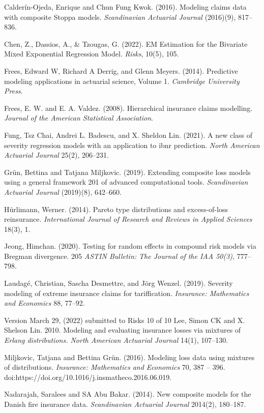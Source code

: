 \documentclass[12pt]{article}%
\theoremstyle{definition}
\theoremstyle{remark}
\begin{document}
{\begin{thebibliography}{}
	\bibitem{} Calderín-Ojeda, Enrique and Chun Fung Kwok. (2016). Modeling claims data with composite Stoppa models. \textit{Scandinavian Actuarial Journal }(2016)(9), 817–836.
	
	\bibitem{} Chen, Z., Dassios, A., \& Tzougas, G. (2022). EM Estimation for the Bivariate Mixed Exponential Regression Model. \textit{Risks}, 10(5), 105.
	
	\bibitem{}Frees, Edward W, Richard A Derrig, and Glenn Meyers. (2014). Predictive modeling applications in actuarial science, Volume 1. \textit{Cambridge University Press}.
	
	\bibitem{}Frees, E. W. and E. A. Valdez. (2008). Hierarchical insurance claims modelling. \textit{Journal of the American 
		Statistical Association}. 
	
	\bibitem{}Fung, Tsz Chai, Andrei L. Badescu, and X. Sheldon Lin. (2021). A new class of severity regression models 
	with an application to ibnr prediction. \textit{North American Actuarial Journal} 25(2), 206–231. 
	
	\bibitem{}Grün, Bettina and Tatjana Miljkovic. (2019). Extending composite loss models using a general framework 201
	of advanced computational tools. \textit{Scandinavian Actuarial Journal} (2019)(8), 642–660. 
	
	\bibitem{}Hürlimann, Werner. (2014). Pareto type distributions and excess-of-loss reinsurance. \textit{International Journal 
		of Research and Reviews in Applied Sciences} 18(3), 1. 
	
	\bibitem{}Jeong, Himchan. (2020). Testing for random effects in compound risk models via Bregman divergence. 205
	\textit{ASTIN Bulletin: The Journal of the IAA 50(3)}, 777–798. 
	
	\bibitem{}Laudagé, Christian, Sascha Desmettre, and Jörg Wenzel. (2019). Severity modeling of extreme insurance 
	claims for tariffication. \textit{Insurance: Mathematics and Economics} 88, 77–92.
	
	\bibitem{}Version March 29, (2022) submitted to Risks 10 of 10
	Lee, Simon CK and X. Shelson Lin. 2010. Modeling and evaluating insurance losses via mixtures of 
	\textit{Erlang distributions. North American Actuarial Journal} 14(1), 107–130.
	
	\bibitem{}Miljkovic, Tatjana and Bettina Grün. (2016). Modeling loss data using mixtures of distributions. \textit{Insurance: 
		Mathematics and Economics} 70, 387 – 396. doi:https://doi.org/10.1016/j.insmatheco.2016.06.019.
	
	\bibitem{}Nadarajah, Saralees and SA Abu Bakar. (2014). New composite models for the Danish fire insurance data. 
	\textit{Scandinavian Actuarial Journal} 2014(2), 180–187. 
	

\end{thebibliography}}
\end{document}
